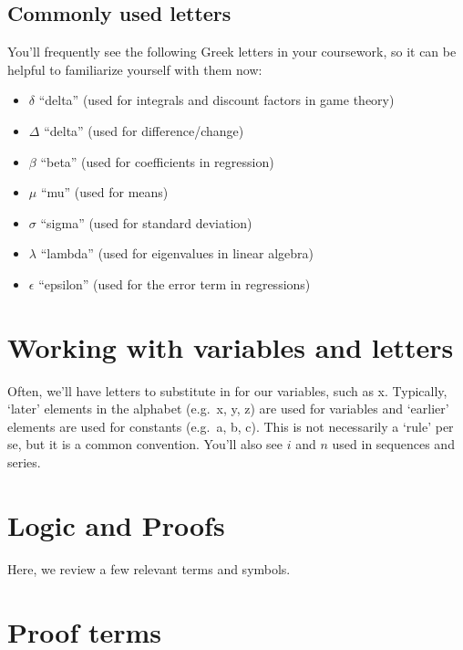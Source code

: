 \documentclass[
]{book}
\providecommand{\tightlist}{%
  \setlength{\itemsep}{0pt}\setlength{\parskip}{0pt}}
\begin{document}
\hypertarget{commonly-used-letters}{%
\subsection{Commonly used letters}\label{commonly-used-letters}}

You'll frequently see the following Greek letters in your coursework, so it can be helpful to familiarize yourself with them now:

\begin{itemize}
\tightlist
\item
  \(\delta\) ``delta'' (used for integrals and discount factors in game theory)
\item
  \(\Delta\) ``delta'' (used for difference/change)
\item
  \(\beta\) ``beta'' (used for coefficients in regression)
\item
  \(\mu\) ``mu'' (used for means)
\item
  \(\sigma\) ``sigma'' (used for standard deviation)
\item
  \(\lambda\) ``lambda'' (used for eigenvalues in linear algebra)
\item
  \(\epsilon\) ``epsilon'' (used for the error term in regressions)
\end{itemize}

\hypertarget{working-with-variables-and-letters}{%
\section{Working with variables and letters}\label{working-with-variables-and-letters}}

Often, we'll have letters to substitute in for our variables, such as x. Typically, `later' elements in the alphabet (e.g.~x, y, z) are used for variables and `earlier' elements are used for constants (e.g.~a, b, c). This is not necessarily a `rule' per se, but it is a common convention. You'll also see \(i\) and \(n\) used in sequences and series.

\hypertarget{logic-and-proofs}{%
\section{Logic and Proofs}\label{logic-and-proofs}}

Here, we review a few relevant terms and symbols.

\hypertarget{proof-terms}{%
\section{Proof terms}\label{proof-terms}}
\end{document}
